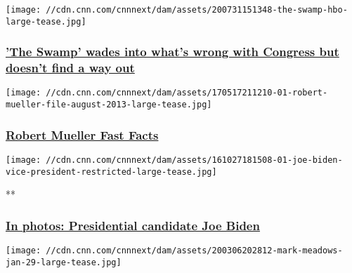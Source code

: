 \href{/2020/08/03/entertainment/the-swamp-review/index.html}{}

\texttt{[image: //cdn.cnn.com/cnnnext/dam/assets/200731151348-the-swamp-hbo-large-tease.jpg]}

\hypertarget{the-swamp-wades-into-whats-wrong-with-congress-but-doesnt-find-a-way-out}{%
\subsubsection{\texorpdfstring{\href{/2020/08/03/entertainment/the-swamp-review/index.html}{'The
Swamp' wades into what's wrong with Congress but doesn't find a way
out}}{'The Swamp' wades into what's wrong with Congress but doesn't find a way out}}\label{the-swamp-wades-into-whats-wrong-with-congress-but-doesnt-find-a-way-out}}

\href{/2018/04/16/us/robert-mueller-fast-facts/index.html}{}

\texttt{[image: //cdn.cnn.com/cnnnext/dam/assets/170517211210-01-robert-mueller-file-august-2013-large-tease.jpg]}

\hypertarget{robert-mueller-fast-facts}{%
\subsubsection{\texorpdfstring{\href{/2018/04/16/us/robert-mueller-fast-facts/index.html}{Robert
Mueller Fast
Facts}}{Robert Mueller Fast Facts}}\label{robert-mueller-fast-facts}}

\href{/2016/12/06/politics/gallery/biden-vice-presidency/index.html}{}

\texttt{[image: //cdn.cnn.com/cnnnext/dam/assets/161027181508-01-joe-biden-vice-president-restricted-large-tease.jpg]}

**

\hypertarget{in-photos-presidential-candidate-joe-biden}{%
\subsubsection{\texorpdfstring{\href{/2016/12/06/politics/gallery/biden-vice-presidency/index.html}{In
photos: Presidential candidate Joe
Biden}}{In photos: Presidential candidate Joe Biden}}\label{in-photos-presidential-candidate-joe-biden}}

\href{/2020/08/03/politics/stimulus-negotiations-state-of-play/index.html}{}

\texttt{[image: //cdn.cnn.com/cnnnext/dam/assets/200306202812-mark-meadows-jan-29-large-tease.jpg]}

